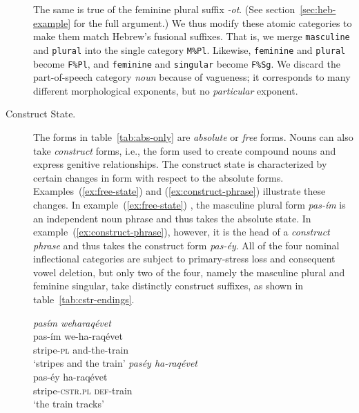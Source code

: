 \begin{description}
 The same is true 
of the feminine plural suffix \textit{-ot}. (See section~\ref{sec:heb-example} for the full argument.)
We thus modify these atomic categories to make them match 
Hebrew's fusional suffixes. That is, we merge \texttt{masculine} 
and \texttt{plural} into the single category \texttt{M\%Pl}. Likewise, 
\texttt{feminine} and \texttt{plural} become \texttt{F\%Pl}, and \texttt{feminine} 
and \texttt{singular} become \texttt{F\%Sg}.
We discard the part-of-speech category \emph{noun} because of vagueness; it corresponds to many different morphological exponents, but no \emph{particular} exponent.

\item[Construct State.]
The forms in table~\ref{tab:abs-only} are \emph{absolute} or \emph{free} forms. 
Nouns can also take \emph{construct} forms, i.e., the form used to create compound 
nouns and express genitive relationships. The construct state is characterized by 
certain changes in form with respect to the absolute forms. 
Examples~(\ref{ex:free-state}) and (\ref{ex:construct-phrase})
illustrate these changes.
In example~(\ref{ex:free-state}) , the masculine plural form \textit{pas-\'{i}m} is an independent noun phrase 
and thus takes the absolute state. In example~(\ref{ex:construct-phrase}), however, it is the head 
of a \emph{construct phrase} and thus takes the construct form \emph{pas-\'{e}y}. 
All of the four nominal inflectional categories are subject to primary-stress loss and consequent 
vowel deletion, but only two of the four, namely the masculine plural and feminine singular, 
take distinctly construct suffixes, as shown in table~\ref{tab:cstr-endings}. 

\begin{exe}
\ex \textit{pas\'{i}m \quad weharaq\'{e}vet} \\ \label{ex:free-state}
pas-\'{i}m \quad we-ha-raq\'{e}vet \\
stripe-\textsc{pl} \quad and-the-train \\
`stripes and the train'
\ex \textit{pas\'{e}y \quad ha-raq\'{e}vet} \\ \label{ex:construct-phrase}
pas-\'{e}y \quad ha-raq\'{e}vet \\
stripe-\textsc{cstr.pl} \quad \textsc{def}-train \\
`the train tracks'
\end{exe}


\end{description}
